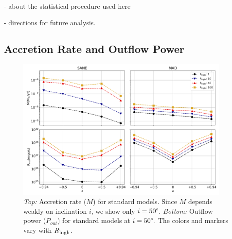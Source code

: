 - about the statistical procedure used here

- directions for future analysis.

\subsection{Accretion Rate and Outflow Power}


\begin{figure}
\centering
\includegraphics[width=0.95\textwidth]{figures/illinoisv3_average_mdot_pout.png}
\caption{{\it Top:} Accretion rate ($\dot{M}$) for standard models. Since $\dot{M}$ depends weakly on inclination $i$, we show only $i=50\degree$. {\it Bottom:} Outflow power ($P_{out}$) for standard models at $i = 50\degree$. The colors and markers vary with $R_\mathrm{high}$.}
\label{fig:accretion_outflow_power_illinois_thermal}
\end{figure}

